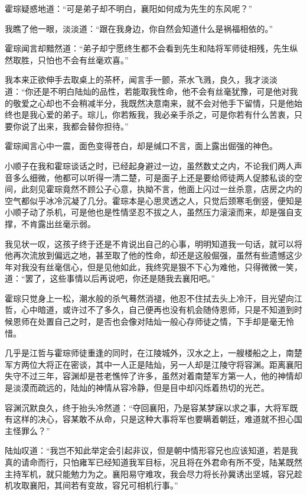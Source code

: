 霍琮疑惑地道：“可是弟子却不明白，襄阳如何成为先生的东风呢？”

我瞧了他一眼，淡淡道：“跟在我身边，你自然会知道什么是祸福相依的。”

霍琮闻言却黯然道：“弟子却宁愿终生都不会看到先生和陆将军师徒相残，先生纵然取胜，只怕也不会有丝毫欢喜。”

我本来正欲伸手去取桌上的茶杯，闻言手一颤，茶水飞溅，良久，我才淡淡道：“你还是不明白陆灿的品性，若能取我性命，他不会有丝毫犹豫，可是他对我的敬爱之心却也不会稍减半分，我既然决意南来，就不会对他手下留情，只是他始终也是我心爱的弟子。琮儿，你若叛我，我必亲手杀之，可是你若有什么苦衷，只要你说了出来，我都会替你担待。”

霍琮闻言心中一震，面色变得苍白，却是缄口不言，面上露出倔强的神色。

小顺子在我和霍琮谈话之时，已经起身避过一边，虽然数丈之内，不论我们两人声音多么细微，他都可以听得一清二楚，可是面子上还是要给师徒两人促膝私谈的空间，此刻见霍琮竟然不顾公子心意，执拗不言，他面上闪过一丝杀意，店房之内的空气都似乎冰冷沉凝了几分。霍琮本是心思灵透之人，只觉后颈寒毛倒竖，便知是小顺子动了杀机，可是他也是性情坚忍不拔之人，虽然压力滚滚而来，却是强自支撑，不肯露出丝毫示弱。

我见状一叹，这孩子终于还是不肯说出自己的心事，明明知道我一句话，就可以将他再次流放到偏远之地，甚至取了他的性命，却还是这般倔强，虽然有些遗憾这少年对我没有丝毫信心，但是见他如此，我终究是狠不下心为难他，只得微微一笑，道：“罢了，这些事情以后再说吧，你还是随我去襄阳吧。”

霍琮只觉身上一松，潮水般的杀气蓦然消褪，他忍不住拭去头上冷汗，目光望向江哲，心中暗道，或许过不了多久，自己便再也没有机会随侍恩师，只是不知道到时候恩师在处置自己之时，是否也会像对陆灿一般心存师徒之情，下手却是毫无怜惜。

几乎是江哲与霍琮师徒重逢的同时，在江陵城外，汉水之上，一艘楼船之上，南楚军方两位大将正在密谈，其中一人正是陆灿，另一人却是江陵守将容渊。距离襄阳失守不过三年，容渊却是苍老憔悴了许多，虽然对着南楚军方第一人，他的神情却是淡漠而疏远的，陆灿的神情从容冷静，但是目中却闪烁着热切的光芒。

容渊沉默良久，终于抬头冷然道：“夺回襄阳，乃是容某梦寐以求之事，大将军既有这样的决心，容某敢不从命，只是这种大事将军也要瞒着朝廷，难道就不担心国主怪罪么？”

陆灿叹道：“我岂不知此举定会引起非议，但是朝中情形容兄也应该知道，若是我真的请命而行，只怕雍军已经知道我军目标，况且将在外君命有所不受，陆某既然主持军机，就只能勉力为之。襄阳易守难攻，我会尽力将长孙冀诱出坚城，容兄趁机攻取襄阳，其间若有变故，容兄可相机行事。”

